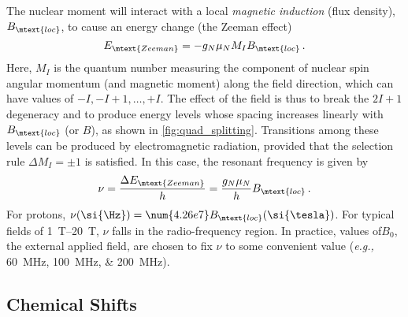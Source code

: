 \documentclass[nobib,nofonts,nols,nohyper,draft]{tufte-handout}
\begin{document}
The nuclear moment will interact with a local \emph{magnetic induction} (flux density), 
\( B_\mtext{loc} \), to cause an energy change (the Zeeman effect)
\begin{equation}
	E_\mtext{Zeeman} = -g_N \mu_N M_I B_\mtext{loc} \, .
	\label{eq:zeeman_energy}
\end{equation}
Here, \( M_I \) is the quantum number measuring the component of nuclear spin angular momentum (and magnetic moment) along the field direction, which can have values of \( -I, -I+1, \ldots, +I \). 
The effect of the field is thus to break the \( 2I + 1 \) degeneracy and to produce energy levels whose spacing increases linearly with \( B_\mtext{loc} \) (or \( B \)), as shown in \cref{fig:quad_splitting}. 
Transitions among these levels can be produced by electromagnetic radiation, provided that the selection rule \( \Delta M_I = \pm 1 \) is satisfied. 
In this case, the resonant frequency is given by 
\begin{equation}
	\nu = \frac{\Delta E_\mtext{Zeeman}}{h} = \frac{g_N\mu_N}{h} B_\mtext{loc}\, .
	\label{eq:res_freq}
\end{equation}
For protons, \( \nu (\si{\Hz}) = \num{4.26e7} B_\mtext{loc} (\si{\tesla}) \). For typical fields of \SIrange{1}{20}{\tesla}, \( \nu \) falls in the radio-frequency region. 
In practice, values of\( B_0 \), the external applied field, are chosen to fix \( \nu \) to some convenient value (\emph{e.g.,} \SIlist{60;100;200}{\MHz}). 


\subsection{Chemical Shifts} %
\label{sub:chemical_shifts}
\end{document}
